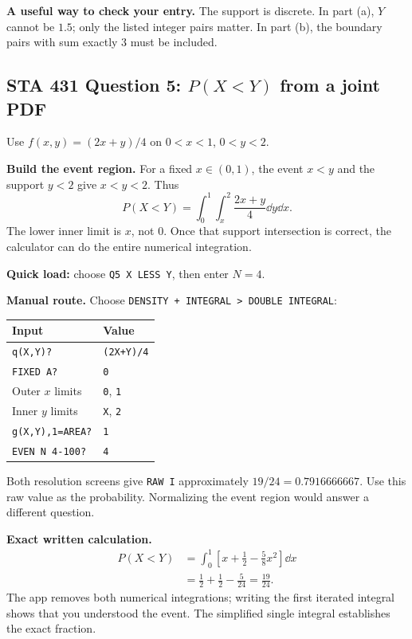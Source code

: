 \textbf{A useful way to check your entry.} The support is discrete. In part (a), $Y$ cannot be $1.5$; only the listed integer pairs matter. In part (b), the boundary pairs with sum exactly 3 must be included.

\clearpage
\subsection{STA 431 Question 5: $P(X<Y)$ from a joint PDF}
Use $f(x,y)=(2x+y)/4$ on $0<x<1$, $0<y<2$.

\textbf{Build the event region.} For a fixed $x\in(0,1)$, the event $x<y$ and the support $y<2$ give $x<y<2$. Thus
\[
P(X<Y)=\int_0^1\int_x^2\frac{2x+y}{4}\dd y\dd x.
\]
The lower inner limit is $x$, not 0. Once that support intersection is correct, the calculator can do the entire numerical integration.

\textbf{Quick load:} choose \texttt{Q5 X LESS Y}, then enter $N=4$.\par
\textbf{Manual route.} Choose \texttt{DENSITY + INTEGRAL > DOUBLE INTEGRAL}:
\begin{center}
\begin{tabular}{@{}ll@{}}
\toprule Input & Value\\\midrule
\texttt{q(X,Y)?} & \texttt{(2X+Y)/4}\\
\texttt{FIXED A?} & \texttt{0}\\
Outer $x$ limits & \texttt{0}, \texttt{1}\\
Inner $y$ limits & \texttt{X}, \texttt{2}\\
\texttt{g(X,Y),1=AREA?} & \texttt{1}\\
\texttt{EVEN N 4-100?} & \texttt{4}\\\bottomrule
\end{tabular}
\end{center}
Both resolution screens give \texttt{RAW I} approximately $19/24=0.7916666667$. Use this raw value as the probability. Normalizing the event region would answer a different question.

\textbf{Exact written calculation.}
\[
\begin{aligned}
P(X<Y)
&=\int_0^1\left[x+\frac12-\frac58x^2\right]\dd x\\
&=\frac12+\frac12-\frac5{24}
=\boxed{\frac{19}{24}}.
\end{aligned}
\]
The app removes both numerical integrations; writing the first iterated integral shows that you understood the event. The simplified single integral establishes the exact fraction.

